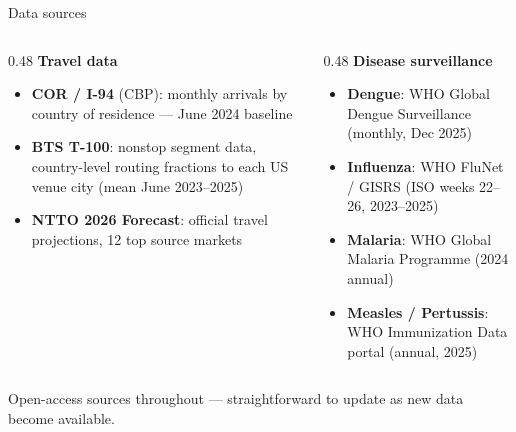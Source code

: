 \documentclass[aspectratio=169, 11pt]{beamer}
\begin{document}
\begin{frame}{Data sources}
  \begin{columns}[T]
    \begin{column}{0.48\textwidth}
      \textbf{Travel data}
      \begin{itemize}
        \item \textbf{COR / I-94} (CBP): monthly arrivals by
              country of residence --- June 2024 baseline
        \item \textbf{BTS T-100}: nonstop segment data,
              country-level routing fractions to each US
              venue city (mean June 2023--2025)
        \item \textbf{NTTO 2026 Forecast}: official travel
              projections, 12 top source markets
      \end{itemize}
    \end{column}
    \begin{column}{0.48\textwidth}
      \textbf{Disease surveillance}
      \begin{itemize}
        \item \textbf{Dengue}: WHO Global Dengue Surveillance
              (monthly, Dec 2025)
        \item \textbf{Influenza}: WHO FluNet / GISRS
              (ISO weeks 22--26, 2023--2025)
        \item \textbf{Malaria}: WHO Global Malaria Programme
              (2024 annual)
        \item \textbf{Measles / Pertussis}: WHO Immunization
              Data portal (annual, 2025)
      \end{itemize}
    \end{column}
  \end{columns}
  \vspace{0.5em}
  \begin{block}{}
    \centering\small
    Open-access sources throughout --- straightforward to update
    as new data become available.
  \end{block}
\end{frame}
\end{document}
